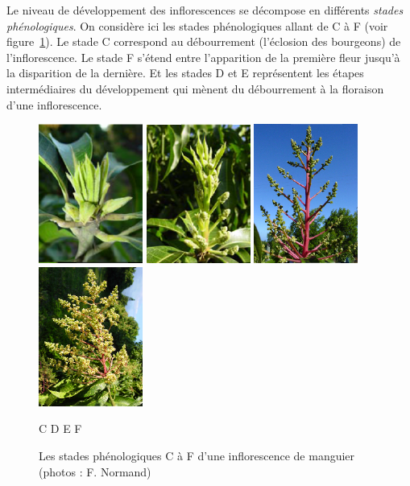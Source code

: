 Le niveau de développement des inflorescences se décompose en différents \emph{stades phénologiques}.
On considère ici les stades phénologiques allant de C à F (voir figure~\ref{fig:stades_inflo}).
Le stade C correspond au débourrement (l'éclosion des bourgeons) de l'inflorescence.
Le stade F s'étend entre l'apparition de la première fleur jusqu'à la disparition de la dernière.
Et les stades D et E représentent les étapes intermédiaires du développement qui mènent du débourrement à la floraison d'une inflorescence.

\begin{figure}[ht]
 \centering
 \includegraphics[scale = 0.8]{photos/infloC.png}
 \includegraphics[scale = 0.8]{photos/infloD.png}
 \includegraphics[scale = 0.8]{photos/infloE.png}
 \includegraphics[scale = 0.8]{photos/infloF.png}
 
 C \hspace{2.3cm} D \hspace{2.3cm} E \hspace{2.3cm} F
 \caption{Les stades phénologiques C à F d'une inflorescence de manguier (photos : F. Normand)}
 \label{fig:stades_inflo}
\end{figure}



